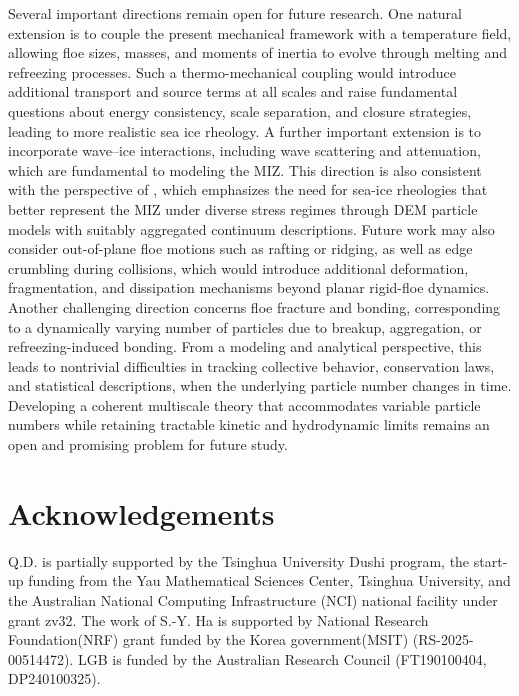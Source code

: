 \documentclass[a4paper,11pt]{article}
\numberwithin{equation}{section}
\theoremstyle{definition}
\begin{document}
Several important directions remain open for future research. One natural extension is to couple the present mechanical framework with a temperature field, allowing floe sizes, masses, and moments of inertia to evolve through melting and refreezing processes. Such a thermo-mechanical coupling would introduce additional transport and source terms at all scales and raise fundamental questions about energy consistency, scale separation, and closure strategies, leading to more realistic sea ice rheology. 
A further important extension is to incorporate wave–ice interactions, including wave scattering and attenuation, which are fundamental to modeling the MIZ. 
This direction is also consistent with the perspective of \cite{squire2022prognosticative}, which emphasizes the need for sea-ice rheologies that better represent the MIZ under diverse stress regimes through DEM particle models with suitably aggregated continuum descriptions.
Future work may also consider out-of-plane floe motions such as rafting or ridging, as well as edge crumbling during collisions, which would introduce additional deformation, fragmentation, and dissipation mechanisms beyond planar rigid-floe dynamics.
%
Another challenging direction concerns floe fracture and bonding, corresponding to a dynamically varying number of particles due to breakup, aggregation, or refreezing-induced bonding. From a modeling and analytical perspective, this leads to nontrivial difficulties in tracking collective behavior, conservation laws, and statistical descriptions, when the underlying particle number changes in time. Developing a coherent multiscale theory that accommodates variable particle numbers while retaining tractable kinetic and hydrodynamic limits remains an open and promising problem for future study.




\section*{Acknowledgements}
Q.D. is partially supported by the Tsinghua University Dushi program, the start-up funding from the Yau Mathematical Sciences Center, Tsinghua University, and the Australian National Computing Infrastructure (NCI) national facility under grant zv32. The work of S.-Y. Ha is supported by National Research Foundation(NRF) grant funded by the Korea government(MSIT) (RS-2025-00514472). LGB is funded by the Australian Research Council (FT190100404, DP240100325).
\end{document}
